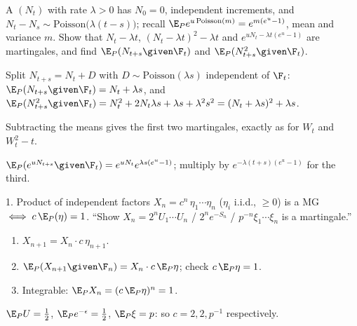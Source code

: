 \begin{problem}
A  $(N_t)$ with rate $\lambda>0$ has $N_0=0$, independent increments, and $N_t-N_s\sim\text{Poisson}\big(\lambda(t-s)\big)$; recall $\E_Pe^{u\,\text{Poisson}(m)}=e^{m(e^u-1)}$, mean and variance $m$. Show that $N_t-\lambda t$, $(N_t-\lambda t)^2-\lambda t$ and $e^{uN_t-\lambda t(e^u-1)}$ are martingales, and find $\E_P(N_{t+s}\given\F_t)$ and $\E_P(N_{t+s}^2\given\F_t)$.
\begin{steps}
  \item Split $N_{t+s}=N_t+D$ with $D\sim\text{Poisson}(\lambda s)$ independent of $\F_t$: $\E_P(N_{t+s}\given\F_t)=N_t+\lambda s$, and $\E_P(N_{t+s}^2\given\F_t)=N_t^2+2N_t\lambda s+\lambda s+\lambda^2s^2=(N_t+\lambda s)^2+\lambda s$.
  \item Subtracting the means gives the first two martingales, exactly as for $W_t$ and $W_t^2-t$.
  \item $\E_P(e^{uN_{t+s}}\given\F_t)=e^{uN_t}e^{\lambda s(e^u-1)}$; multiply by $e^{-\lambda(t+s)(e^u-1)}$ for the third.
\end{steps}
\end{problem}


\begin{card}{1. Product of independent factors}
\Formula
$X_n=c^n\,\eta_1\cdots\eta_n$ ($\eta_i$ i.i.d., $\ge0$) is a MG $\iff c\,\E_P(\eta)=1$.
\UseWhen
``Show $X_n=2^nU_1\cdots U_n$ / $2^ne^{-S_n}$ / $p^{-n}\xi_1\cdots\xi_n$ is a martingale.''
\HowTo
\begin{enumerate}
  \item $X_{n+1}=X_n\cdot c\,\eta_{n+1}$.
  \item $\E_P(X_{n+1}\given\F_n)=X_n\cdot c\,\E_P\eta$; check $c\,\E_P\eta=1$.
  \item Integrable: $\E_PX_n=(c\,\E_P\eta)^n=1$.
\end{enumerate}
\Caveats
{}
\begin{cardex}
$\E_PU=\frac12$, $\E_Pe^{-\epsilon}=\frac12$, $\E_P\xi=p$: so $c=2,2,p^{-1}$ respectively.
\end{cardex}
\end{card}

